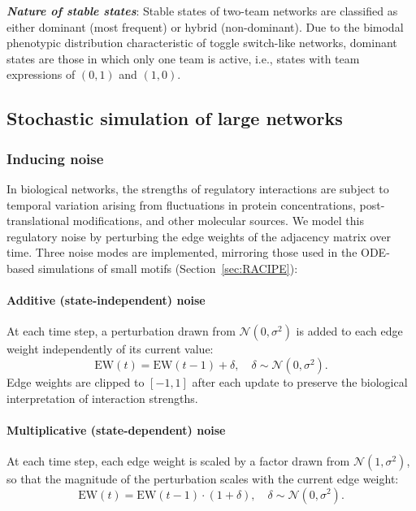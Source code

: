 \documentclass[11pt]{article}
\begin{document}
\noindent\textbf{\textit{Nature of stable states}}: Stable states of two-team networks are classified as either dominant (most frequent) or hybrid (non-dominant). Due to the bimodal phenotypic distribution characteristic of toggle switch-like networks, dominant states are those in which only one team is active, i.e., states with team expressions of $(0,1)$ and $(1,0)$.

\subsection{Stochastic simulation of large networks}

\subsubsection{Inducing noise}\label{sssec:noise_def}

In biological networks, the strengths of regulatory interactions are subject to temporal variation arising from fluctuations in protein concentrations, post-translational modifications, and other molecular sources. We model this regulatory noise by perturbing the edge weights of the adjacency matrix over time. Three noise modes are implemented, mirroring those used in the ODE-based simulations of small motifs (Section~\ref{sec:RACIPE}):

\paragraph{Additive (state-independent) noise}
At each time step, a perturbation drawn from $\mathcal{N}(0, \sigma^2)$ is added to each edge weight independently of its current value:
\begin{equation}
    \mathrm{EW}(t) = \mathrm{EW}(t-1) + \delta, \quad \delta \sim \mathcal{N}(0, \sigma^2).
\end{equation}
Edge weights are clipped to $[-1, 1]$ after each update to preserve the biological interpretation of interaction strengths.

\paragraph{Multiplicative (state-dependent) noise}
At each time step, each edge weight is scaled by a factor drawn from $\mathcal{N}(1, \sigma^2)$, so that the magnitude of the perturbation scales with the current edge weight:
\begin{equation}
    \mathrm{EW}(t) = \mathrm{EW}(t-1) \cdot (1 + \delta), \quad \delta \sim \mathcal{N}(0, \sigma^2).
\end{equation}
\end{document}
